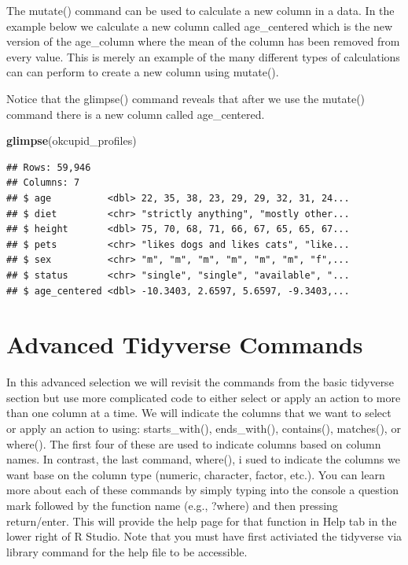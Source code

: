 \documentclass[
]{krantz}
\makeatletter
\newenvironment{Shaded}{\begin{snugshade}}{\end{snugshade}}
\newcommand{\DataTypeTok}[1]{\textcolor[rgb]{0.27,0.27,0.27}{#1}}
\newcommand{\KeywordTok}[1]{\textcolor[rgb]{0.27,0.27,0.27}{\textbf{#1}}}
\newcommand{\NormalTok}[1]{#1}
\newcommand{\OperatorTok}[1]{\textcolor[rgb]{0.43,0.43,0.43}{\textbf{#1}}}
\newcommand{\OtherTok}[1]{\textcolor[rgb]{0.37,0.37,0.37}{#1}}
\newcommand{\StringTok}[1]{\textcolor[rgb]{0.5,0.5,0.5}{#1}}
\newenvironment{kframe}{%
\medskip{}
\setlength{\fboxsep}{.8em}
 \def\at@end@of@kframe{}%
 \ifinner\ifhmode%
  \def\at@end@of@kframe{\end{minipage}}%
  \begin{minipage}{\columnwidth}%
 \fi\fi%
 \def\FrameCommand##1{\hskip\@totalleftmargin \hskip-\fboxsep
 \colorbox{shadecolor}{##1}\hskip-\fboxsep
     \hskip-\linewidth \hskip-\@totalleftmargin \hskip\columnwidth}%
 \MakeFramed {\advance\hsize-\width
   \@totalleftmargin\z@ \linewidth\hsize
   \@setminipage}}%
 {\par\unskip\endMakeFramed%
 \at@end@of@kframe}
\renewenvironment{Shaded}{\begin{kframe}}{\end{kframe}}
\makeatother
\begin{document}
The mutate() command can be used to calculate a new column in a data. In the example below we calculate a new column called age\_centered which is the new version of the age\_column where the mean of the column has been removed from every value. This is merely an example of the many different types of calculations can can perform to create a new column using mutate().

\begin{Shaded}
\end{Shaded}

Notice that the glimpse() command reveals that after we use the mutate() command there is a new column called age\_centered.

\begin{Shaded}
\begin{Highlighting}[]
\KeywordTok{glimpse}\NormalTok{(okcupid_profiles)}
\end{Highlighting}
\end{Shaded}

\begin{verbatim}
## Rows: 59,946
## Columns: 7
## $ age          <dbl> 22, 35, 38, 23, 29, 29, 32, 31, 24...
## $ diet         <chr> "strictly anything", "mostly other...
## $ height       <dbl> 75, 70, 68, 71, 66, 67, 65, 65, 67...
## $ pets         <chr> "likes dogs and likes cats", "like...
## $ sex          <chr> "m", "m", "m", "m", "m", "m", "f",...
## $ status       <chr> "single", "single", "available", "...
## $ age_centered <dbl> -10.3403, 2.6597, 5.6597, -9.3403,...
\end{verbatim}

\hypertarget{advanced-tidyverse-commands}{%
\section{Advanced Tidyverse Commands}\label{advanced-tidyverse-commands}}

In this advanced selection we will revisit the commands from the basic tidyverse section but use more complicated code to either select or apply an action to more than one column at a time. We will indicate the columns that we want to select or apply an action to using: starts\_with(), ends\_with(), contains(), matches(), or where(). The first four of these are used to indicate columns based on column names. In contrast, the last command, where(), i sued to indicate the columns we want base on the column type (numeric, character, factor, etc.). You can learn more about each of these commands by simply typing into the console a question mark followed by the function name (e.g., ?where) and then pressing return/enter. This will provide the help page for that function in Help tab in the lower right of R Studio. Note that you must have first activiated the tidyverse via library command for the help file to be accessible.
\end{document}
